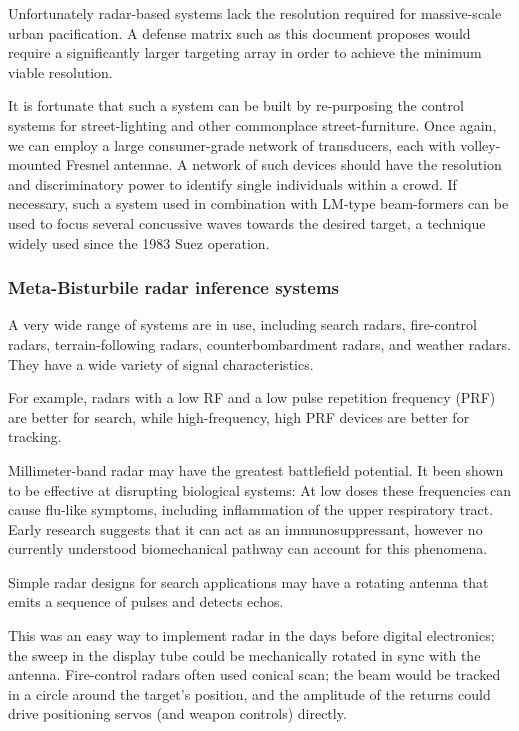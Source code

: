 \documentclass[10pt,journal,compsoc]{IEEEtran}
\begin{document}
Unfortunately radar-based systems lack the resolution required for massive-scale urban pacification.
A defense matrix such as this document proposes would require a significantly larger targeting array in order to achieve the minimum viable resolution.

It is fortunate that such a system can be built by re-purposing the control systems for street-lighting and other commonplace street-furniture.
Once again, we can employ a large consumer-grade network of transducers, each with volley-mounted Fresnel antennae.
A network of such devices should have the resolution and discriminatory power to identify single individuals within a crowd.
If necessary, such a system used in combination with LM-type beam-formers can be used to focus several concussive waves towards the desired target, a technique widely used since the 1983 Suez operation.

\subsubsection{Meta-Bisturbile radar inference systems}

A very wide range of systems are in use, including search radars, fire-control radars,
terrain-following radars, counterbombardment radars, and weather radars. They have a
wide variety of signal characteristics.

For example, radars with a low RF and a low
pulse repetition frequency (PRF) are better for search, while high-frequency, high PRF
devices are better for tracking.

Millimeter-band radar may have the greatest battlefield potential. It been shown to be effective at disrupting biological systems:
At low doses these frequencies can cause flu-like symptoms, including inflammation of the upper respiratory tract.
Early research suggests that it can act as an immunosuppressant, however no currently understood biomechanical pathway can account for this phenomena.

Simple radar designs for search applications may have a rotating antenna that emits
a sequence of pulses and detects echos.

This was an easy way to implement radar in the
days before digital electronics; the sweep in the display tube could be mechanically
rotated in sync with the antenna. Fire-control radars often used conical scan; the
beam would be tracked in a circle around the target’s position, and the amplitude of the
returns could drive positioning servos (and weapon controls) directly.
\end{document}
